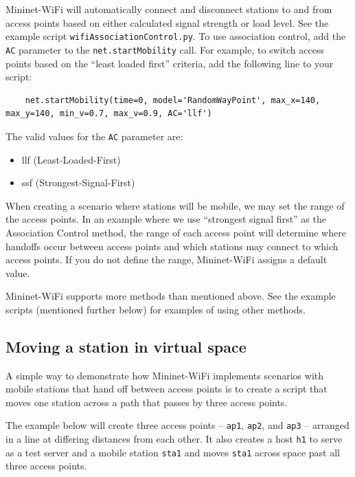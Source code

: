 Mininet-WiFi will automatically connect and disconnect stations to and from access points based on either calculated signal strength or load level. See the example script \texttt{wifiAssociationControl.py}. To use association control, add the \texttt{AC} parameter to the \texttt{net.startMobility} call. For example, to switch access points based on the “least loaded first” criteria, add the following line to your script:

\begin{verbatim}
    net.startMobility(time=0, model='RandomWayPoint', max_x=140, max_y=140, min_v=0.7, max_v=0.9, AC='llf')
\end{verbatim}

The valid values for the \texttt{AC} parameter are:

\begin{itemize}
\item llf (Least-Loaded-First)
\item ssf (Strongest-Signal-First)\\
\end{itemize}

When creating a scenario where stations will be mobile, we may set the range of the access points. In an example where we use “strongest signal first” as the Association Control method, the range of each access point will determine where handoffs occur between access points and which stations may connect to which access points. If you do not define the range, Mininet-WiFi assigns a default value. 

Mininet-WiFi supports more methods than mentioned above. See the example scripts (mentioned further below) for examples of using other methods.


\subsection{Moving a station in virtual space}

A simple way to demonstrate how Mininet-WiFi implements scenarios with mobile stations that hand off between access points is to create a script that moves one station across a path that passes by three access points.

The example below will create three access points -- \texttt{ap1}, \texttt{ap2}, and \texttt{ap3} -- arranged in a line at differing distances from each other. It also creates a host \texttt{h1} to serve as a test server and a mobile station \texttt{sta1} and moves \texttt{sta1} across space past all three access points.

